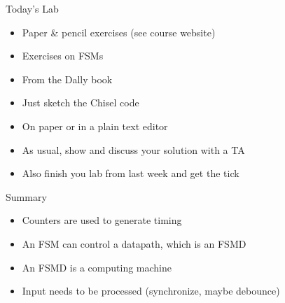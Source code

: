 \begin{frame}[fragile]{Today's Lab}
\begin{itemize}
\item Paper \& pencil exercises (see course website)
\item Exercises on FSMs
\item From the Dally book
\item Just sketch the Chisel code
\item On paper or in a plain text editor
\item As usual, show and discuss your solution with a TA
\item Also finish you lab from last week and get the tick
\end{itemize}
\end{frame}

\begin{frame}[fragile]{Summary}
\begin{itemize}
\item Counters are used to generate timing
\item An FSM can control a datapath, which is an FSMD
\item An FSMD is a computing machine
\item Input needs to be processed (synchronize, maybe debounce)
\end{itemize}
\end{frame}




